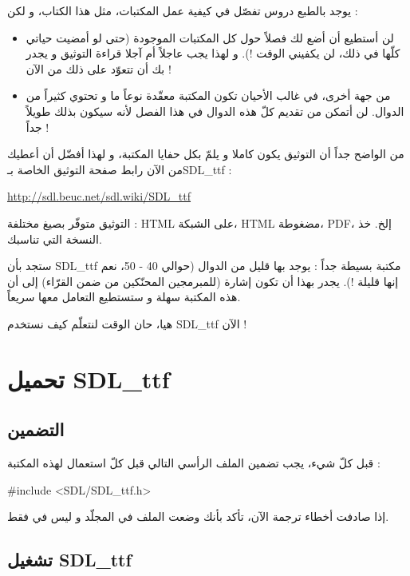 يوجد بالطبع دروس تفصّل في كيفية عمل المكتبات، مثل هذا الكتاب، و لكن :

\begin{itemize}
	\item لن أستطيع أن أضع لك فصلاً حول كل المكتبات الموجودة (حتى لو أمضيت حياتي كلّها في ذلك، لن يكفيني الوقت !). و لهذا يجب عاجلاً أم آجلا قراءة التوثيق و يجدر بك أن تتعوّد على ذلك من الآن !
	\item من جهة أخرى، في غالب الأحيان تكون المكتبة معقّدة نوعاً ما و تحتوي كثيراً من الدوال. لن أتمكن من تقديم كلّ هذه الدوال في هذا الفصل لأنه سيكون بذلك طويلاً جداً !
\end{itemize}

من الواضح جداً أن التوثيق يكون كاملا و يلمّ بكل حفايا المكتبة، و لهذا أفضّل أن أعطيك من الآن رابط صفحة التوثيق الخاصة بـ\textenglish{SDL\_ttf} :

\url{http://sdl.beuc.net/sdl.wiki/SDL_ttf}

التوثيق متوفّر بصيغ مختلفة : 
\textenglish{HTML}
على الشبكة، 
\textenglish{HTML}
مضغوطة،
\textenglish{PDF}،
إلخ. خذ النسخة التي تناسبك.

ستجد بأن
\textenglish{SDL\_ttf}
مكتبة بسيطة جداً : يوجد بها قليل من الدوال (حوالي 40 - 50، نعم إنها قليلة !). يجدر بهذا أن تكون إشارة (للمبرمجين المحنّكين من ضمن القرّاء) إلى أن هذه المكتبة سهلة و ستستطيع التعامل معها سريعاً.

هيا، حان الوقت لنتعلّم كيف نستخدم
\textenglish{SDL\_ttf}
الآن !

\section{تحميل \textenglish{SDL\_ttf}}

\subsection{التضمين}

قبل كلّ شيء، يجب تضمين الملف الرأسي التالي قبل كلّ استعمال لهذه المكتبة :

\begin{Csource}
#include <SDL/SDL_ttf.h>
\end{Csource}

إذا صادفت أخطاء ترجمة الآن، تأكد بأنك وضعت الملف
في المجلّد
و ليس في 
فقط.

\subsection{تشغيل \textenglish{SDL\_ttf}}

